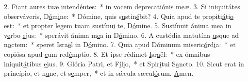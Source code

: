 2. Fiant aures tuæ \uline{i}ntend\uline{é}ntes:~* in vocem deprecati\uline{ó}nis m\uline{e}æ.
3. Si iniquitátes observáveris, D\uline{ó}m\uline{i}ne:~* Dómine, quis s\uline{u}stin\uline{é}bit?
4. Quia apud te propiti\uline{á}ti\uline{o} est:~* et propter legem tuam sustínu\uline{i} te, D\uline{ó}mine.
5. Sustínuit ánima mea in v\uline{e}rbo \uline{e}jus:~* sperávit ánima m\uline{e}a in D\uline{ó}mino.
6. A custódia matutína \uline{u}sque ad n\uline{o}ctem:~* speret Isra\uline{ë}l in D\uline{ó}mino.
7. Quia apud Dóminum miseric\uline{ó}rd\uline{i}a:~* et copiósa apud \uline{e}um red\uline{é}mptio.
8. Et ipse rédimet \uline{I}sr\uline{a}ël:~* ex ómnibus iniquit\uline{á}tibus \uline{e}jus.
9. Glória Patri, et F\uline{í}l\uline{i}o,~* et Spir\uline{í}tui S\uline{a}ncto.
10. Sicut erat in princípio, et n\uline{u}nc, et s\uline{e}mper,~* et in sǽcula sæcul\uline{ó}rum. \uline{A}men.
